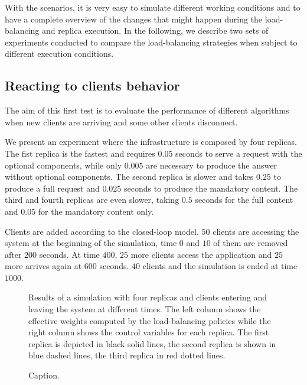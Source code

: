 With the scenarios, it is very easy to simulate different working
conditions and to have a complete overview of the changes that might
happen during the load-balancing and replica execution. In the
following, we describe two sets of experiments conducted to compare
the load-balancing strategies when subject to different execution
conditions.

\subsection{Reacting to clients behavior}

The aim of this first test is to evaluate the performance of different
algorithms when new clients are arriving and some other clients
disconnect.

We present an experiment where the infrastructure is composed by four
replicas. The fist replica is the fastest and requires $0.05$ seconds
to serve a request with the optional components, while only $0.005$
are necessary to produce the answer without optional components. The
second replica is slower and takes $0.25$ to produce a full request
and $0.025$ seconds to produce the mandatory content. The third and
fourth replicas are even slower, taking $0.5$ seconds for the full
content and $0.05$ for the mandatory content only.

Clients are added according to the closed-loop model. $50$ clients are
accessing the system at the beginning of the simulation, time $0$ and
$10$ of them are removed after $200$ seconds. At time $400$, $25$ more
clients access the application and $25$ more arrives again at $600$
seconds.  $40$ clients and the simulation is ended at time $1000$.

\begin{figure}
  \centering 
  \caption{Results of a simulation with four replicas and clients
    entering and leaving the system at different times. The left
    column shows the effective weights computed by the load-balancing
    policies while the right column shows the control variables for
    each replica. The first replica is depicted in black solid lines,
    the second replica is shown in blue dashed lines, the third
    replica in red dotted lines.}
\label{fig:clientchanges-full}
\end{figure}

\begin{figure}
\centering

\vspace{-4mm}
\caption{Caption.}
\label{fig:clientchanges-boxplot}
\end{figure}

